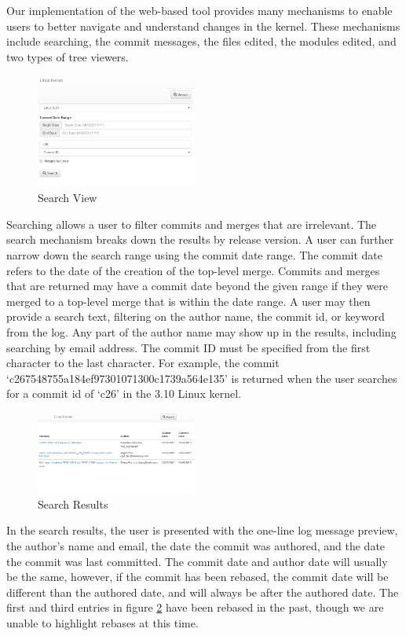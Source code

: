 \documentclass[conference, draftclsnofoot]{IEEEtran}
\begin{document}
Our implementation of the web-based tool provides many mechanisms to enable
users to better navigate and understand changes in the kernel. These mechanisms
include searching, the commit messages, the files edited, the modules edited,
and two types of tree viewers.

\begin{figure}[h]
	\centering
	\includegraphics[width=0.47\textwidth]{figures/search.png}
	\caption{Search View}
	\label{fig:search}
\end{figure}

Searching allows a user to filter commits and merges that are irrelevant.
The search mechanism breaks down the results by release version. A user can
further narrow down the search range using the commit date range. The commit
date refers to the date of the creation of the top-level merge. Commits and
merges that are returned may have a commit date beyond the given range if they
were merged to a top-level merge that is within the date range. A user may then
provide a search text, filtering on the author name, the commit id, or keyword
from the log. Any part of the author name may show up in the results, including
searching by email address. The commit ID must be specified from the first
character to the last character. For example, the commit
`c267548755a184ef97301071300c1739a564e135' is returned when the user searches
for a commit id of `c26' in the 3.10 Linux kernel.

\begin{figure}[h]
	\centering
	\includegraphics[width=0.47\textwidth]{figures/search_results.png}
	\caption{Search Results}
	\label{fig:results}
\end{figure}

In the search results, the user is presented with the one-line log message
preview, the author's name and email, the date the commit was authored, and the
date the commit was last committed.  The commit date and author date will
usually be the same, however, if the commit has been rebased, the commit date
will be different than the authored date, and will always be after the authored
date. The first and third entries in figure \ref{fig:results} have been rebased
in the past, though we are unable to highlight rebases at this time.
\end{document}
